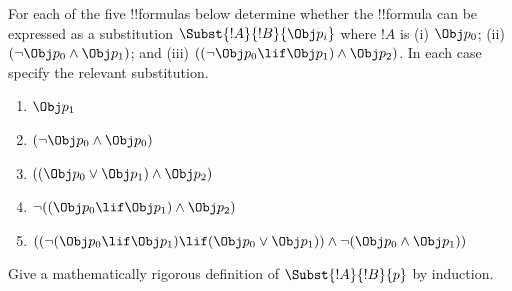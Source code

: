 \documentclass[../../../include/open-logic-section]{subfiles}
\begin{document}
\begin{prob} For each of the five !!{formula}s below determine whether the 
 !!{formula} can be expressed as a substitution \( \Subst{!A}{!B}{\Obj p_i} \)
 where \( !A \) is (i) \( \Obj p_0 \); (ii) \( ( \lnot \Obj p_0 \land \Obj
 p_1) \); and (iii) \( ( ( \lnot \Obj p_0 \lif \Obj p_1 ) \land \Obj
 p_2 ) \). In each case specify the relevant substitution.
  \begin{enumerate}
    \item \( \Obj p_1 \) 
    \item \( ( \lnot \Obj p_0 \land \Obj p_0 ) \)
    \item \( ( ( \Obj p_0 \lor \Obj p_1 ) \land \Obj p_2 )  \)
    \item \( \lnot ( ( \Obj p_0 \lif \Obj p_1 ) \land \Obj p_2 ) \)
    \item \( (( \lnot ( \Obj p_0 \lif \Obj p_1 ) \lif ( \Obj p_0 \lor \Obj p_1 )) \land \lnot ( \Obj p_0 \land \Obj p_1 )) \)
  \end{enumerate}
\end{prob}

\begin{prob}
Give a mathematically rigorous definition of $\Subst{!A}{!B}{p}$ by
induction.
\end{prob}
\end{document}
